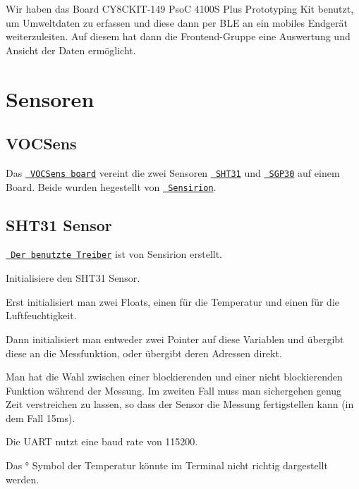 Wir haben das Board C\+Y8\+C\+K\+I\+T-\/149 PsoC 4100S Plus Prototyping Kit benutzt, um Umweltdaten zu erfassen und diese dann per B\+LE an ein mobiles Endgerät weiterzuleiten. Auf diesem hat dann die Frontend-\/\+Gruppe eine Auswertung und Ansicht der Daten ermöglicht.\hypertarget{autotoc_md0_autotoc_md1}{}\section{Sensoren}\label{autotoc_md0_autotoc_md1}
\hypertarget{autotoc_md0_autotoc_md2}{}\subsection{V\+O\+C\+Sens}\label{autotoc_md0_autotoc_md2}
Das \href{https://www.glyn.de/Produkte/Sensoren/VOCSens}{\texttt{ V\+O\+C\+Sens board}} vereint die zwei Sensoren \href{https://www.sensirion.com/en/environmental-sensors/humidity-sensors/digital-humidity-sensors-for-various-applications/}{\texttt{ S\+H\+T31}} und \href{https://www.sensirion.com/de/umweltsensoren/gassensoren/multipixel-gassensoren/}{\texttt{ S\+G\+P30}} auf einem Board. Beide wurden hegestellt von \href{https://www.sensirion.com/en/}{\texttt{ Sensirion}}.\hypertarget{autotoc_md0_autotoc_md3}{}\subsection{S\+H\+T31 Sensor}\label{autotoc_md0_autotoc_md3}
\href{https://github.com/Sensirion/embedded-sht}{\texttt{ Der benutzte Treiber}} ist von Sensirion erstellt.

Initialisiere den S\+H\+T31 Sensor.

Erst initialisiert man zwei Floats, einen für die Temperatur und einen für die Luftfeuchtigkeit.

Dann initialisiert man entweder zwei Pointer auf diese Variablen und übergibt diese an die Messfunktion, oder übergibt deren Adressen direkt.

Man hat die Wahl zwischen einer blockierenden und einer nicht blockierenden Funktion während der Messung. Im zweiten Fall muss man sichergehen genug Zeit verstreichen zu lassen, so dass der Sensor die Messung fertigstellen kann (in dem Fall 15ms).

Die U\+A\+RT nutzt eine baud rate von 115200.

Das ° Symbol der Temperatur könnte im Terminal nicht richtig dargestellt werden.

